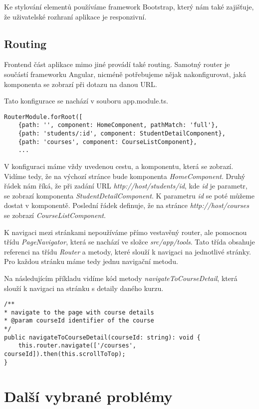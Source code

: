Ke stylování elementů používáme framework Bootstrap, který nám také zajišťuje, že uživatelské rozhraní aplikace je responzivní.

\subsection{Routing}

Frontend část aplikace mimo jiné provádí také routing. Samotný router je součástí frameworku Angular, nicméně potřebujeme nějak nakonfigurovat, jaká komponenta se zobrazí při dotazu na danou URL.

Tato konfigurace se nachází v souboru app.module.ts.
\lstset{style=typescript}
\begin{lstlisting}
RouterModule.forRoot([
	{path: '', component: HomeComponent, pathMatch: 'full'},
	{path: 'students/:id', component: StudentDetailComponent},
	{path: 'courses', component: CourseListComponent},
	...
\end{lstlisting}

V konfiguraci máme vždy uvedenou cestu, a komponentu, která se zobrazí.
Vidíme tedy, že na výchozí stránce bude komponenta \textit{HomeComponent}. 
Druhý řádek nám říká, že při zadání URL \textit{http://host/students/id}, kde \textit{id} je parametr, se zobrazí komponenta \textit{StudentDetailComponent}. K parametru \textit{id} se poté můžeme dostat v komponentě.
Poslední řádek definuje, že na stránce \textit{http://host/courses} se zobrazí \textit{CourseListComponent}.

K navigaci mezi stránkami nepoužíváme přímo vestavěný router, ale pomocnou třídu \textit{PageNavigator}, která se nachází ve složce \textit{src/app/tools}. Tato třída obsahuje referenci na třídu \textit{Router} a metody, které slouží k navigaci na jednotlivé stránky. Pro každou stránku máme tedy jednu navigační metodu.

Na následujícím příkladu vidíme kód metody \textit{navigateToCourseDetail}, která slouží k navigaci na stránku s detaily daného kurzu.
\begin{lstlisting}
/**
* navigate to the page with course details
* @param courseId identifier of the course
*/
public navigateToCourseDetail(courseId: string): void {
	this.router.navigate(['/courses', courseId]).then(this.scrollToTop);
}
\end{lstlisting}


\section{Další vybrané problémy}


